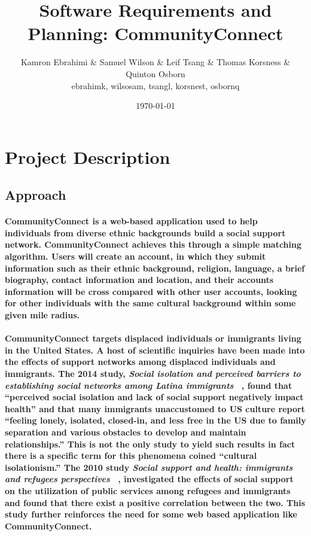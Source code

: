 \documentclass[12pt]{article}
\title{Software Requirements and Planning: CommunityConnect}
\author{Kamron Ebrahimi \& Samuel Wilson \& Leif Tsang \& Thomas Korsness \& Quinton Osborn \\ ebrahimk, wilsosam, tsangl, korsnest, osbornq}
\date{\today}
\begin{document}
\maketitle

\tableofcontents

\section{\bf Project Description}
	\subsection{\bf Approach}
		\paragraph{\normalfont \indent CommunityConnect is a web-based application used to help individuals from diverse ethnic backgrounds build a social support network. CommunityConnect achieves this through a simple matching algorithm. Users will create an account, in which they submit information such as their ethnic background, religion, language, a brief biography, contact information and location, and their accounts information will be cross compared with other user accounts, looking for other individuals with the same cultural background within some given mile radius.
		}
		\paragraph{\normal \indent CommunityConnect targets displaced individuals or immigrants living in the United States. A host of scientific inquiries have been made into the effects of support networks among displaced individuals and immigrants. The 2014 study, \textit{Social isolation and perceived barriers to establishing social networks among Latina immigrants} ~\cite{Cite1}, found that “perceived social isolation and lack of social support negatively impact health” and  that many immigrants unaccustomed to US culture report “feeling lonely, isolated, closed-in, and less free in the US due to family separation and various obstacles to develop and maintain relationships.” This is not the only study to yield such results in fact there is a specific term for this phenomena coined “cultural isolationism.” The 2010 study \textit{Social support and health: immigrants and refugees perspectives} ~\cite{Cite2}, investigated the effects of social support on the utilization of public services among refugees and immigrants and found that there exist a positive correlation between the two. This study further reinforces the need for some web based application like CommunityConnect.
		}
\end{document}
